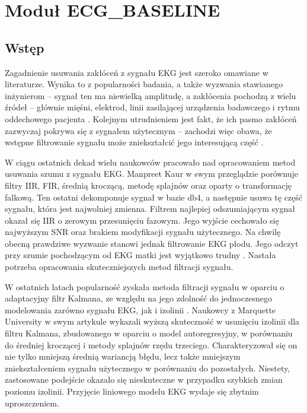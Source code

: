 \section{Moduł ECG\_BASELINE}

\subsection{Wstęp}

Zagadnienie usuwania zakłóceń z sygnału EKG jest szeroko omawiane w literaturze. Wynika to z popularności badania, a także wyzwania stawianego inżynierom -- sygnał ten ma niewielką amplitudę, a zakłócenia pochodzą z wielu źródeł -- głównie mięśni, elektrod, linii zasilającej urządzenia badawczego i rytmu oddechowego pacjenta \cite{Sayadi2008}.  Kolejnym utrudnieniem jest fakt, że ich pasmo zakłóceń zazwyczaj pokrywa się z sygnałem użytecznym -- zachodzi więc obawa, że wstępne filtrowanie sygnału może zniekształcić jego interesującą część \cite{Jane1992}. 

W ciągu ostatnich dekad wielu naukowców pracowało nad opracowaniem metod usuwania szumu z sygnału EKG. Manpreet Kaur \cite{Kaur2011} w swym przeglądzie porównuje filtry IIR, FIR, średnią kroczącą, metodę splajnów oraz oparty o transformację falkową. Ten ostatni dekomponuje sygnał w bazie db4, a następnie usuwa tę część sygnału, która jest najwolniej zmienna. Filtrem najlepiej odszumiającym sygnał okazał się IIR o zerowym przesunięciu fazowym. Jego wyjście cechowało się najwyższym SNR oraz brakiem modyfikacji sygnału użytecznego. Na chwilę obecną prawdziwe wyzwanie stanowi jednak filtrowanie EKG płodu. Jego odczyt przy szumie pochodzącym od EKG matki jest wyjątkowo trudny \cite{Prasanth2013}. Nastała potrzeba opracowania skuteczniejszych metod filtracji sygnału.

W ostatnich latach popularność zyskała metoda filtracji sygnału w oparciu o adaptacyjny filtr Kalmana, ze względu na jego zdolność do jednoczesnego modelowania zarówno sygnału EKG, jak i izolinii \cite{Sayadi2008,Mneimneh2006}.  Naukowcy z Marquette University w swym artykule \cite{Mneimneh2006} wykazali wyższą skuteczność w usunięciu izolinii dla filtru Kalmana, zbudowanego w oparciu o model autoregresyjny, w porównaniu do średniej kroczącej i metody splajnów rzędu trzeciego. Charakteryzował się on nie tylko mniejszą średnią wariancją błędu, lecz także mniejszym zniekształceniem sygnału użytecznego w porównaniu do pozostałych. Niestety, zastosowane podejście okazało się nieskuteczne w przypadku szybkich zmian poziomu izolinii. Przyjęcie liniowego modelu EKG wydaje się zbytnim uproszczeniem.


